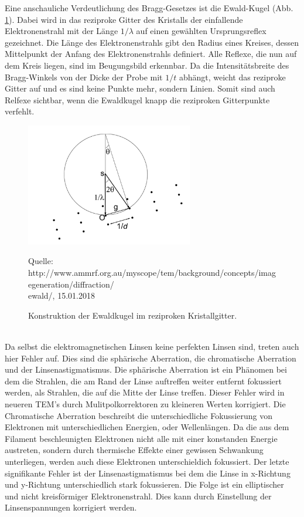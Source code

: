 \documentclass[a4paper,11pt,DIV=11]{scrartcl}
\begin{document}
Eine anschauliche Verdeutlichung des Bragg-Gesetzes ist die Ewald-Kugel (Abb. \ref{ewald}). Dabei wird in das reziproke Gitter des Kristalls der einfallende Elektronenstrahl mit der Länge \(1/\lambda\) auf einen gewählten Ursprungsreflex gezeichnet. Die Länge des Elektronenstrahls gibt den Radius eines Kreises, dessen Mittelpunkt der Anfang des Elektronenstrahls definiert. Alle Reflexe, die nun auf dem Kreis liegen, sind im Beugungsbild erkennbar. Da die Intensitätsbreite des Bragg-Winkels von der Dicke der Probe mit \(1/t\) abhängt, weicht das reziproke Gitter auf und es sind keine Punkte mehr, sondern Linien. Somit sind auch Relfexe sichtbar, wenn die Ewaldkugel knapp die reziproken Gitterpunkte verfehlt.
\begin{figure}\center
\includegraphics[width=0.65\textwidth]{ewald.png}
\caption{Konstruktion der Ewaldkugel im reziproken Kristallgitter.}
\begin{flushleft}
{\footnotesize Quelle: http://www.ammrf.org.au/myscope/tem/background/concepts/imagegeneration/diffraction/\\ewald/, 15.01.2018}
\end{flushleft}
\label{ewald}
\end{figure}
\\
Da selbst die elektromagnetischen Linsen keine perfekten Linsen sind, treten auch hier Fehler auf. Dies sind die sphärische Aberration, die chromatische Aberration und der Linsenastigmatismus. Die sphärische Aberration ist ein Phänomen bei dem die Strahlen, die am Rand der Linse auftreffen weiter entfernt fokussiert werden, als Strahlen, die auf die Mitte der Linse treffen. Dieser Fehler wird in neueren TEM's durch Mulitpolkorrektoren zu kleineren Werten korrigiert. Die Chromatische Aberration beschreibt die unterschiedliche Fokussierung von Elektronen mit unterschiedlichen Energien, oder Wellenlängen. Da die aus dem Filament beschleunigten Elektronen nicht alle mit einer konstanden Energie austreten, sondern durch thermische Effekte einer gewissen Schwankung unterliegen, werden auch diese Elektronen unterschieldich fokussiert. Der letzte signifikante Fehler ist der Linsenastigmatismus bei dem die Linse in x-Richtung und y-Richtung unterschiedlich stark fokussieren. Die Folge ist ein elliptischer und nicht kreisförmiger Elektronenstrahl. Dies kann durch Einstellung der Linsenspannungen korrigiert werden.
	
\end{document}
